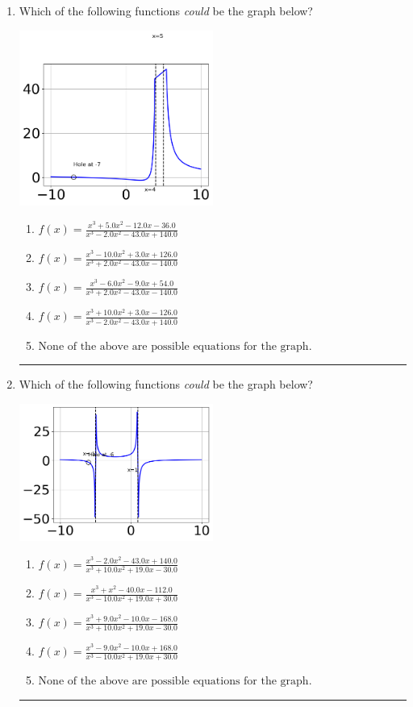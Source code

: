 \documentclass[14pt]{extbook}
\newcommand{\litem}[1]{\item#1\hspace*{-1cm}\rule{\textwidth}{0.4pt}}
\begin{document}
\begin{enumerate}
{\begin{enumerate}[label=\Alph*.]
\end{enumerate} }
\litem{
Which of the following functions \textit{could} be the graph below?
\begin{center}
    \includegraphics[width=0.5\textwidth]{../Figures/identifyGraphOfRationalFunctionCopyC.png}
\end{center}
\begin{enumerate}[label=\Alph*.]
\item \( f(x)=\frac{x^{3} +5.0 x^{2} -12.0 x -36.0}{x^{3} -2.0 x^{2} -43.0 x + 140.0} \)
\item \( f(x)=\frac{x^{3} -10.0 x^{2} +3.0 x + 126.0}{x^{3} +2.0 x^{2} -43.0 x -140.0} \)
\item \( f(x)=\frac{x^{3} -6.0 x^{2} -9.0 x + 54.0}{x^{3} +2.0 x^{2} -43.0 x -140.0} \)
\item \( f(x)=\frac{x^{3} +10.0 x^{2} +3.0 x -126.0}{x^{3} -2.0 x^{2} -43.0 x + 140.0} \)
\item \( \text{None of the above are possible equations for the graph.} \)

\end{enumerate} }
\litem{
Which of the following functions \textit{could} be the graph below?
\begin{center}
    \includegraphics[width=0.5\textwidth]{../Figures/identifyGraphOfRationalFunctionC.png}
\end{center}
\begin{enumerate}[label=\Alph*.]
\item \( f(x)=\frac{x^{3} -2.0 x^{2} -43.0 x + 140.0}{x^{3} +10.0 x^{2} +19.0 x -30.0} \)
\item \( f(x)=\frac{x^{3} + x^{2} -40.0 x -112.0}{x^{3} -10.0 x^{2} +19.0 x + 30.0} \)
\item \( f(x)=\frac{x^{3} +9.0 x^{2} -10.0 x -168.0}{x^{3} +10.0 x^{2} +19.0 x -30.0} \)
\item \( f(x)=\frac{x^{3} -9.0 x^{2} -10.0 x + 168.0}{x^{3} -10.0 x^{2} +19.0 x + 30.0} \)
\item \( \text{None of the above are possible equations for the graph.} \)


\end{enumerate}}
\end{enumerate}
\end{document}
